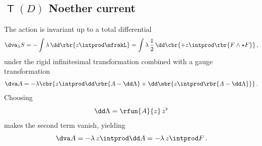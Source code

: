 \documentclass[a4paper]{article}
\begin{document}
\subsection[$T(D)$ Noether current]{$\msansT(D)$ Noether current}

The action is invariant up to a total differential
\begin{align}
\dva_{\lambda} S = - \int \lambda\,\dd\rbr{z \intprod \mfrakL}
= \int \lambda\,\frac{1}{2}\,\dd\cbr{
	+ z\intprod \rbr{F\wedge\star F} }\,,
\label{eq:tot-diff-em-10}
\end{align}
under the rigid infinitesimal transformation combined with a gauge 
transformation \cite[eq.\ 3.46]{Scheck2017}
\begin{align}
\dva A = - \lambda\cbr{z\intprod \dd \rbr{A-\dd\Lambda} + 
	\dd\sbr{z\intprod\rbr{A-\dd\Lambda}}}\,.
\end{align}
Choosing
\begin{align}
\dd\Lambda = \rfun{A}{z}\,z^{\flat}
\end{align}
makes the second term vanish, yielding
\begin{align}
\dva A = - \lambda\,z\intprod \dd A = - \lambda\,z\intprod F \,.
\end{align}
\end{document}
